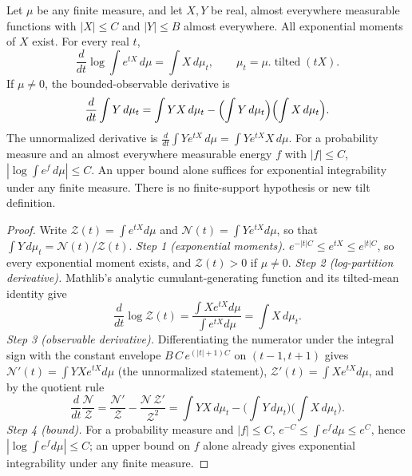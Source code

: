 \begin{lemma}\label{lem:sg-tal:bounded-tilt}
\leanok
{}
Let $\mu$ be any finite measure, and let $X,Y$ be real, almost everywhere measurable
functions with $|X|\le C$ and $|Y|\le B$ almost everywhere. All exponential moments
of $X$ exist. For every real $t$,
\[
\frac{d}{dt}\log\int e^{tX}\,d\mu=\int X\,d\mu_t,
\qquad \mu_t=\mu.\operatorname{tilted}(tX).
\]
If $\mu\ne0$, the bounded-observable derivative is
\[
\frac{d}{dt}\int Y\,d\mu_t
=\int YX\,d\mu_t-\Bigl(\int Y\,d\mu_t\Bigr)\Bigl(\int X\,d\mu_t\Bigr).
\]
The unnormalized derivative is $\frac{d}{dt}\int Ye^{tX}\,d\mu=\int Ye^{tX}X\,d\mu$.
For a probability measure and an almost everywhere measurable energy $f$ with $|f|\le C$,
$|\log\int e^f\,d\mu|\le C$. An upper bound alone suffices for exponential integrability
under any finite measure. There is no finite-support hypothesis or new tilt definition.
\end{lemma}
\begin{proof}
\leanok
Write $\mathcal Z(t)=\int e^{tX}d\mu$ and $\mathcal N(t)=\int Ye^{tX}d\mu$, so that $\int Y\,d\mu_t=\mathcal N(t)/\mathcal Z(t)$.
\emph{Step 1 (exponential moments).} $e^{-|t|C}\le e^{tX}\le e^{|t|C}$, so every exponential moment exists, and $\mathcal Z(t)>0$ if $\mu\ne0$.
\emph{Step 2 (log-partition derivative).} Mathlib's analytic cumulant-generating function and its tilted-mean identity give
\[
\frac d{dt}\log\mathcal Z(t)=\frac{\int Xe^{tX}d\mu}{\int e^{tX}d\mu}=\int X\,d\mu_t .
\]
\emph{Step 3 (observable derivative).} Differentiating the numerator under the integral sign with the constant envelope $B\,C\,e^{(|t|+1)C}$ on $(t-1,t+1)$ gives $\mathcal N'(t)=\int YXe^{tX}d\mu$ (the unnormalized statement), $\mathcal Z'(t)=\int Xe^{tX}d\mu$, and by the quotient rule
\[
\frac d{dt}\frac{\mathcal N}{\mathcal Z}=\frac{\mathcal N'}{\mathcal Z}-\frac{\mathcal N\,\mathcal Z'}{\mathcal Z^2}=\int YX\,d\mu_t-\Big(\int Y\,d\mu_t\Big)\Big(\int X\,d\mu_t\Big).
\]
\emph{Step 4 (bound).} For a probability measure and $|f|\le C$, $e^{-C}\le\int e^fd\mu\le e^C$, hence $|\log\int e^fd\mu|\le C$; an upper bound on $f$ alone already gives exponential integrability under any finite measure.
\end{proof}

